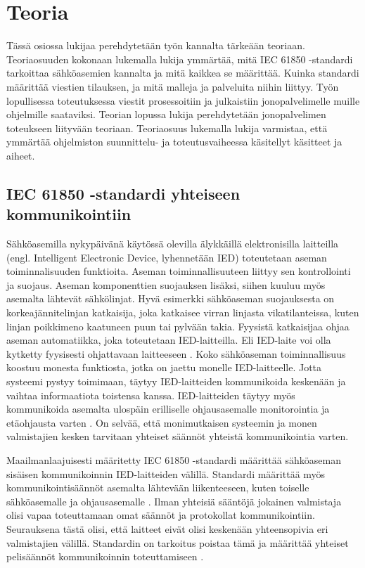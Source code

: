 \chapter{Teoria}
\label{ch:teoria}
Tässä osiossa lukijaa perehdytetään työn kannalta tärkeään teoriaan. Teoriaosuuden kokonaan lukemalla lukija ymmärtää, mitä IEC 61850 -standardi tarkoittaa sähköasemien kannalta ja mitä kaikkea se määrittää. Kuinka standardi määrittää viestien tilauksen, ja mitä malleja ja palveluita niihin liittyy. Työn lopullisessa toteutuksessa viestit prosessoitiin ja julkaistiin jonopalvelimelle muille ohjelmille saataviksi. Teorian lopussa lukija perehdytetään jonopalvelimen toteukseen liityvään teoriaan. Teoriaosuus lukemalla lukija varmistaa, että ymmärtää ohjelmiston suunnittelu- ja toteutusvaiheessa käsitellyt käsitteet ja aiheet.


\section{IEC 61850 -standardi yhteiseen kommunikointiin}
Sähköasemilla nykypäivänä käytössä olevilla älykkäillä elektronisilla laitteilla (engl. Intelligent Electronic Device, lyhennetään IED) toteutetaan aseman toiminnalisuuden funktioita. Aseman toiminnallisuuteen liittyy sen kontrollointi ja suojaus. Aseman komponenttien suojauksen lisäksi, siihen kuuluu myös asemalta lähtevät sähkölinjat. Hyvä esimerkki sähköaseman suojauksesta on korkeajännitelinjan katkaisija, joka katkaisee virran linjasta vikatilanteissa, kuten linjan poikkimeno kaatuneen puun tai pylvään takia. Fyysistä katkaisijaa ohjaa aseman automatiikka, joka toteutetaan IED-laitteilla. Eli IED-laite voi olla kytketty fyysisesti ohjattavaan laitteeseen \cite[s.~63--64]{IEC61850-7-1}. Koko sähköaseman toiminnallisuus koostuu monesta funktiosta, jotka on jaettu monelle IED-laitteelle. Jotta systeemi pystyy toimimaan, täytyy IED-laitteiden kommunikoida keskenään ja vaihtaa informaatiota toistensa kanssa. IED-laitteiden täytyy myös kommunikoida asemalta ulospäin erilliselle ohjausasemalle monitorointia ja etäohjausta varten \cite[s.~1]{Brunner2008}. On selvää, että monimutkaisen systeemin ja monen valmistajien kesken tarvitaan yhteiset säännöt yhteistä kommunikointia varten.

Maailmanlaajuisesti määritetty IEC 61850 -standardi määrittää sähköaseman sisäisen kommunikoinnin IED-laitteiden välillä. Standardi määrittää myös kommunikointisäännöt asemalta lähtevään liikenteeseen, kuten toiselle sähköasemalle ja ohjausasemalle \cite[s.~10]{IEC61850-7-1}. Ilman yhteisiä sääntöjä jokainen valmistaja olisi vapaa toteuttamaan omat säännöt ja protokollat kommunikointiin. Seurauksena tästä olisi, että laitteet eivät olisi keskenään yhteensopivia eri valmistajien välillä. Standardin on tarkoitus poistaa tämä ja määrittää yhteiset pelisäännöt kommunikoinnin toteuttamiseen \cite[s.~1]{Kaneda2008}.

